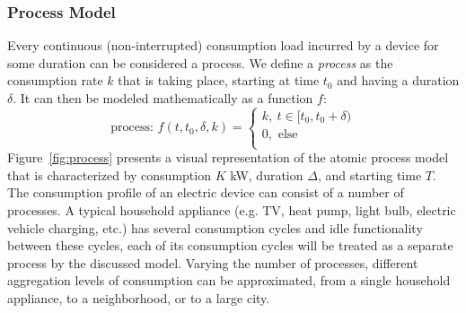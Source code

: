 \documentclass[conference]{IEEEtran}
\begin{document}
\subsubsection{Process Model}
Every continuous (non-interrupted) consumption load incurred by a device for some duration can be considered a process.  We define a \emph{process} as the consumption rate $k$ that is taking place, starting at time $t_0$ and having a duration $\delta$. It can then be modeled mathematically as a function $f$:
\begin{equation}
\text{process: }f(t, t_0, \delta, k) =
\left\lbrace
\begin{array}{l}
 k,~t \in [t_0, t_0+\delta)\\
 0, \text{ else}\\
\end{array}
\right.
\end{equation}
Figure~\ref{fig:process} presents a visual representation of the atomic process model that is characterized by consumption $K$ kW, duration $\Delta$, and starting time $T$. The consumption profile of an electric device can consist of a number of processes. A typical household appliance (e.g. TV, heat pump, light bulb, electric vehicle charging, etc.) has several consumption cycles and idle functionality between these cycles, each of its consumption cycles will be treated as a separate process by the discussed model. Varying the number of processes, different aggregation levels of consumption can be approximated, from a single household appliance, to a neighborhood, or to a large city.
\end{document}
